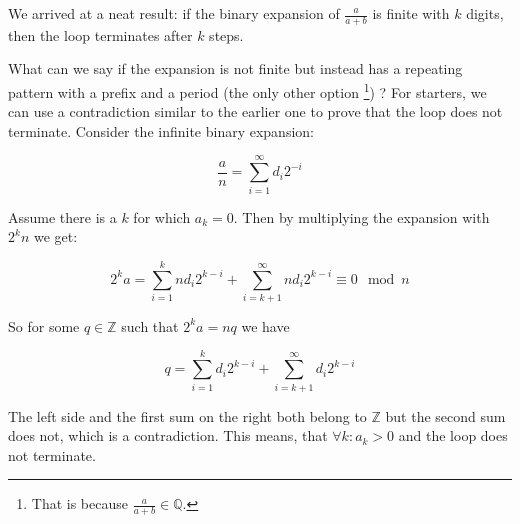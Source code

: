 We arrived at a neat result: if the binary expansion of $\frac{a}{a+b}$ is finite with $k$ digits, then the loop terminates after $k$ steps.

What can we say if the expansion is not finite but instead has a repeating pattern with a prefix and a period (the only other option \footnote{That is because $\frac{a}{a+b} \in \mathbb{Q}$.}) ? For starters, we can use a contradiction similar to the earlier one to prove that the loop does not terminate. Consider the infinite binary expansion:

$$
  \frac{a}{n} = \sum_{i = 1}^\infty d_i 2^{-i}
$$

Assume there is a $k$ for which $a_k = 0$. Then by multiplying the expansion with $2^k n$ we get:

$$
  2^k a = \sum_{i = 1}^k n d_i 2^{k-i} + \sum_{i = k+1}^\infty n d_i 2^{k-i} \equiv 0 \mod n
$$

So for some $q \in \mathbb{Z}$ such that $2^k a = n q$ we have

$$
  q = \sum_{i = 1}^k d_i 2^{k-i} + \sum_{i = k+1}^\infty d_i 2^{k-i}
$$

The left side and the first sum on the right both belong to $\mathbb{Z}$ but the second sum does not, which is a contradiction. This means, that $\forall k: a_k > 0$ and the loop does not terminate.

